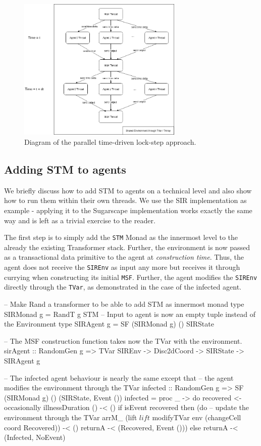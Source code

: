 \begin{figure}
	\centering
	\includegraphics[width=0.7\textwidth, angle=0]{./fig/concurrentabs/stm_abs.png}
	\caption[Diagram of the parallel time-driven lock-step approach]{Diagram of the parallel time-driven lock-step approach.}
	\label{fig:stm_abs_structure}
\end{figure}

\subsection{Adding STM to agents}
We briefly discuss how to add STM to agents on a technical level and also show how to run them within their own threads. We use the SIR implementation as example - applying it to the Sugarscape implementation works exactly the same way and is left as a trivial exercise to the reader.

The first step is to simply add the \texttt{STM} Monad as the innermost level to the already the existing Transformer stack. Further, the environment is now passed as a transactional data primitive to the agent at \textit{construction time}. Thus, the agent does not receive the \texttt{SIREnv} as input any more but receives it through currying when constructing its initial \texttt{MSF}. Further, the agent modifies the \texttt{SIREnv} directly through the \texttt{TVar}, as demonstrated in the case of the infected agent.

\begin{HaskellCode}
-- Make Rand a transformer to be able to add STM as innermost monad
type SIRMonad g = RandT g STM
-- Input to agent is now an empty tuple instead of the Environment
type SIRAgent g = SF (SIRMonad g) () SIRState

-- The MSF construction function takes now the TVar with the environment.
sirAgent :: RandomGen g => TVar SIREnv -> Disc2dCoord -> SIRState -> SIRAgent g

-- The infected agent behaviour is nearly the same except that
-- the agent modifies the environment through the TVar
infected :: RandomGen g => SF (SIRMonad g) () (SIRState, Event ())
infected = proc _ -> do
  recovered <- occasionally illnessDuration () -< ()
  if isEvent recovered
    then (do
      -- update the environment through the TVar
      arrM_ (lift $ lift $ modifyTVar env (changeCell coord Recovered)) -< ()
      returnA -< (Recovered, Event ()))
    else returnA -< (Infected, NoEvent)
\end{HaskellCode}

